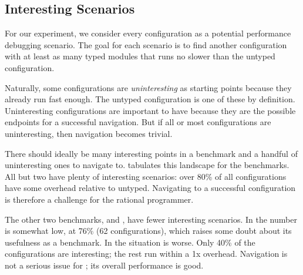 \subsection{Interesting Scenarios}

For our experiment, we consider every configuration as a potential
performance debugging scenario.
The goal for each scenario is to find another configuration
with at least as many typed modules that runs no slower than the
untyped configuration.

Naturally, some configurations are \emph{uninteresting} as starting
points because they already run fast enough.
The untyped configuration is one of these by definition.
Uninteresting configurations are important to have because they
are the possible endpoints for a successful navigation.
But if all or most configurations are uninteresting, then
navigation becomes trivial.

There should ideally be many interesting points in a benchmark
and a handful of uninteresting ones to navigate to.
 tabulates this landscape for the benchmarks.
All but two have plenty of interesting scenarios: over 80\% of
all configurations have some overhead relative to untyped.
Navigating to a successful configuration is therefore a challenge
for the rational programmer.

The other two benchmarks,  and , have
fewer interesting scenarios.
In  the number is somewhat low, at 76\% (62 configurations),
which raises some doubt about its usefulness as a benchmark.
In  the situation is worse.
Only 40\% of the configurations are interesting; the rest run within a 1x
overhead.
Navigation is not a serious issue for ; its overall
performance is good.

